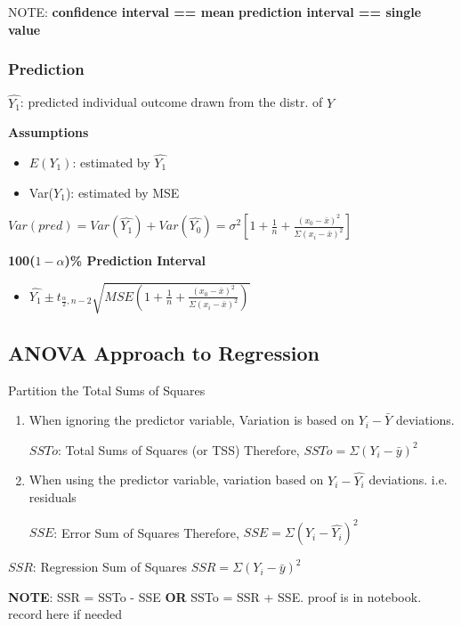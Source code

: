 \documentclass[11pt]{article}
\begin{document}
NOTE:
\textbf{confidence interval == mean}
\textbf{prediction interval == single value}

\subsubsection{Prediction}
\label{sec:orgb09e275}
\(\hat{Y_1}\): predicted individual outcome drawn from the distr. of \(Y\)

\textbf{Assumptions}
\begin{itemize}
\item \(E(Y_1)\): estimated by \(\hat{Y_1}\)
\item Var(\(Y_1\)): estimated by MSE
\end{itemize}

\(Var(pred) = Var(\hat{Y_1}) + Var(\hat{Y_0}) = \sigma^2 [ 1 + \frac{1}{n} +
\frac{(x_0 - \bar{x})^2}{\Sigma (x_i - \bar{x})^2}]\)

\textbf{100(\(1 - \alpha\))\% Prediction Interval}
\begin{itemize}
\item \(\hat{Y_1} \pm t_{\frac{\alpha}{2}, n - 2} \sqrt{MSE (1 + \frac{1}{n} +
  \frac{(x_0 - \bar{x})^2}{\Sigma (x_i - \bar{x})^2})}\)
\end{itemize}

\subsection{ANOVA Approach to Regression}
\label{sec:org5e84c98}

Partition the Total Sums of Squares
\begin{enumerate}
\item When ignoring the predictor variable, Variation is based on \(Y_i - \bar{Y}\)
deviations.

\(SSTo\): Total Sums of Squares (or TSS)
Therefore, \(SSTo = \Sigma(Y_i - \bar{y})^2\)

\item When using the predictor variable, variation based on \(Y_i - \hat{Y_i}\)
deviations. i.e. residuals

\(SSE\): Error Sum of Squares
Therefore, \(SSE = \Sigma(Y_i - \hat{Y_i})^2\)
\end{enumerate}

\(SSR\): Regression Sum of Squares
\(SSR = \Sigma (Y_i - \bar{y})^2\)

\textbf{NOTE}: SSR = SSTo - SSE \textbf{OR} SSTo = SSR + SSE. proof is in notebook. record
here if needed
\end{document}
